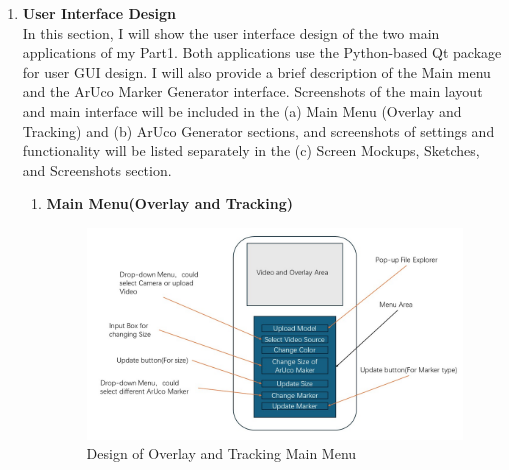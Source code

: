 \documentclass[12pt]{article}
\begin{document}
\begin{enumerate}
      \item \textbf{User Interface Design}
            \\
            In this section, I will show the user interface design of the two main applications of my Part1. Both applications use the Python-based Qt package for user GUI design.
            I will also provide a brief description of the Main menu and the ArUco Marker Generator interface.
            Screenshots of the main layout and main interface will be included in the (a) Main Menu (Overlay and Tracking) and (b) ArUco Generator sections, and screenshots of settings and functionality will be listed separately in the (c) Screen Mockups, Sketches, and Screenshots section.
            \begin{enumerate}
                  \item \textbf{Main Menu(Overlay and Tracking)}
                        \begin{figure}[H]
                              \centering
                              \includegraphics[width=1.2\textwidth]{design_overlay.jpg}
                              \caption{Design of Overlay and Tracking Main Menu}
                        \end{figure}


\end{enumerate}
\end{enumerate}
\end{document}
